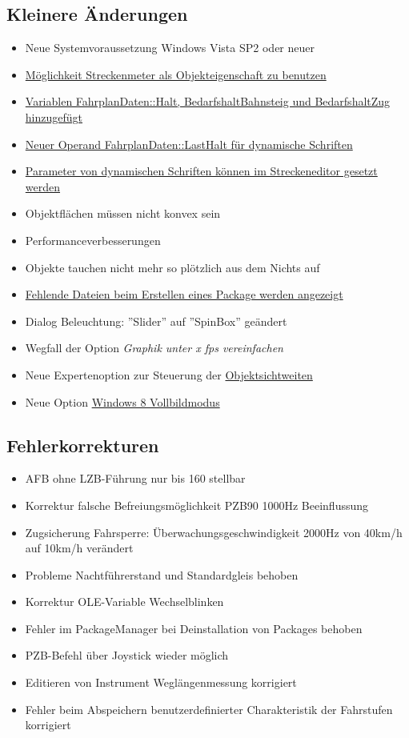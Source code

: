 \subsection{Kleinere Änderungen}
\begin{itemize}
\item Neue Systemvoraussetzung Windows Vista SP2 oder neuer 
\item \hyperref[sec:editor-obj-sichtbarkeitssteuerung-streig]{Möglichkeit Streckenmeter als Objekteigenschaft zu benutzen}
\item \hyperref[sec:editor-obj-logischeausdruecke-vars]{Variablen FahrplanDaten::Halt, BedarfshaltBahnsteig und BedarfshaltZug hinzugefügt}
\item \hyperref[sec:editor-obj-dynstr]{Neuer Operand FahrplanDaten::LastHalt für dynamische Schriften}
\item \hyperref[sec:editor-obj-dynstr-params]{Parameter von dynamischen Schriften können im Streckeneditor gesetzt werden}
\item Objektflächen müssen nicht konvex sein
\item Performanceverbesserungen
\item Objekte tauchen nicht mehr so plötzlich aus dem Nichts auf
\item \hyperref[sec:editor.allg.packages]{Fehlende Dateien beim Erstellen eines Package werden angezeigt}
\item Dialog Beleuchtung: ''Slider'' auf ''SpinBox'' geändert
\item Wegfall der Option \emph{Graphik unter x fps vereinfachen}
\item Neue Expertenoption zur Steuerung der \hyperref[sec.sim.optionen.darstellung]{Objektsichtweiten}
\item Neue Option \hyperref[sec.sim.optionen.darstellung]{Windows 8 Vollbildmodus}
\end{itemize}

\subsection{Fehlerkorrekturen}
\begin{itemize}
\item AFB ohne LZB-Führung nur bis 160 stellbar
\item Korrektur falsche Befreiungsmöglichkeit PZB90 1000Hz Beeinflussung
\item Zugsicherung Fahrsperre: Überwachungsgeschwindigkeit 2000Hz von 40km/h auf 10km/h verändert
\item Probleme Nachtführerstand und Standardgleis behoben
\item Korrektur OLE-Variable Wechselblinken
\item Fehler im PackageManager bei Deinstallation von Packages behoben
\item PZB-Befehl über Joystick wieder möglich
\item Editieren von Instrument Weglängenmessung korrigiert
\item Fehler beim Abspeichern benutzerdefinierter Charakteristik der Fahrstufen korrigiert
\end{itemize}

